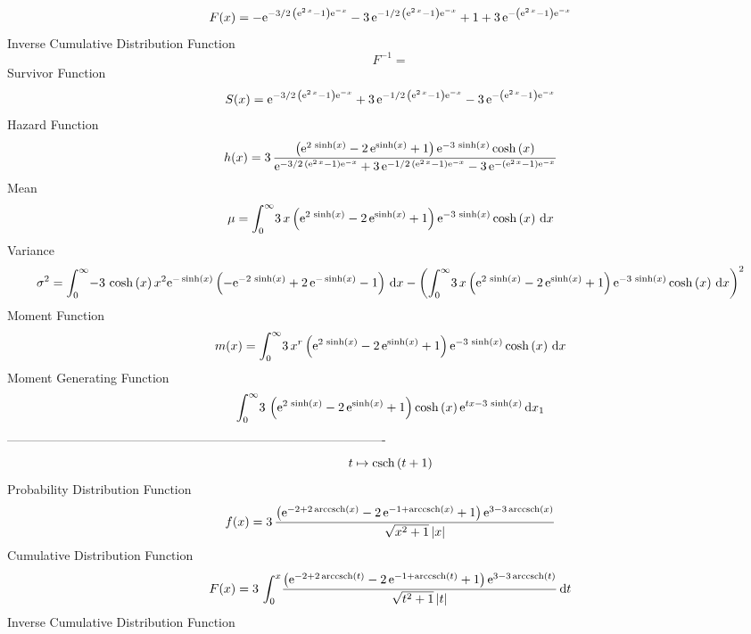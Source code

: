 \documentclass[12pt]{article}
\begin{document}
 $$F(x)=-{{\rm e}^{-3/2\, \left( {{\rm e}^{2\,x}}-1 \right) {{\rm e}^{-x}}}}-3
\,{{\rm e}^{-1/2\, \left( {{\rm e}^{2\,x}}-1 \right) {{\rm e}^{-x}}}}+
1+3\,{{\rm e}^{- \left( {{\rm e}^{2\,x}}-1 \right) {{\rm e}^{-x}}}}
$$ Inverse Cumulative Distribution Function 
  $$F^{-1} =  
$$Survivor Function 
 $$ S(x)={{\rm e}^{-3/2\, \left( {{\rm e}^{2\,x}}-1 \right) {{\rm e}^{-x}}}}+3
\,{{\rm e}^{-1/2\, \left( {{\rm e}^{2\,x}}-1 \right) {{\rm e}^{-x}}}}-
3\,{{\rm e}^{- \left( {{\rm e}^{2\,x}}-1 \right) {{\rm e}^{-x}}}}
$$ Hazard Function 
 $$ h(x)=3\,{\frac { \left( {{\rm e}^{2\,\sinh \left( x \right) }}-2\,{{\rm e}^
{\sinh \left( x \right) }}+1 \right) {{\rm e}^{-3\,\sinh \left( x
 \right) }}\cosh \left( x \right) }{{{\rm e}^{-3/2\, \left( {{\rm e}^{
2\,x}}-1 \right) {{\rm e}^{-x}}}}+3\,{{\rm e}^{-1/2\, \left( {{\rm e}^
{2\,x}}-1 \right) {{\rm e}^{-x}}}}-3\,{{\rm e}^{- \left( {{\rm e}^{2\,
x}}-1 \right) {{\rm e}^{-x}}}}}}
$$Mean 
 $$ \mu=\int_{0}^{\infty }\!3\,x \left( {{\rm e}^{2\,\sinh \left( x \right) }}
-2\,{{\rm e}^{\sinh \left( x \right) }}+1 \right) {{\rm e}^{-3\,\sinh
 \left( x \right) }}\cosh \left( x \right) \,{\rm d}x
$$ Variance 
 $$ \sigma^2 = \int_{0}^{\infty }\!-3\,\cosh \left( x \right) {x}^{2}{{\rm e}^{-\sinh
 \left( x \right) }} \left( -{{\rm e}^{-2\,\sinh \left( x \right) }}+2
\,{{\rm e}^{-\sinh \left( x \right) }}-1 \right) \,{\rm d}x- \left( 
\int_{0}^{\infty }\!3\,x \left( {{\rm e}^{2\,\sinh \left( x \right) }}
-2\,{{\rm e}^{\sinh \left( x \right) }}+1 \right) {{\rm e}^{-3\,\sinh
 \left( x \right) }}\cosh \left( x \right) \,{\rm d}x \right) ^{2}
$$Moment Function 
 $$ m(x) = \int_{0}^{\infty }\!3\,{x}^{r} \left( {{\rm e}^{2\,\sinh \left( x
 \right) }}-2\,{{\rm e}^{\sinh \left( x \right) }}+1 \right) {{\rm e}^
{-3\,\sinh \left( x \right) }}\cosh \left( x \right) \,{\rm d}x
$$ Moment Generating Function 
 $$\int_{0}^{\infty }\!3\, \left( {{\rm e}^{2\,\sinh \left( x \right) }}-
2\,{{\rm e}^{\sinh \left( x \right) }}+1 \right) \cosh \left( x
 \right) {{\rm e}^{tx-3\,\sinh \left( x \right) }}\,{\rm d}x_{{1}}
$$-------------------------------------------------------------------------------------------  \\$$t\mapsto {\rm csch} \left(t+1\right)
$$Probability Distribution Function 
$$  f(x)=3\,{\frac { \left( {{\rm e}^{-2+2\,{\rm arccsch} \left(x\right)}}-2\,{
{\rm e}^{-1+{\rm arccsch} \left(x\right)}}+1 \right) {{\rm e}^{3-3\,
{\rm arccsch} \left(x\right)}}}{\sqrt {{x}^{2}+1} \left| x \right| }}
$$Cumulative Distribution Function  
 $$F(x)=3\,\int_{0}^{x}\!{\frac { \left( {{\rm e}^{-2+2\,{\rm arccsch} \left(t
\right)}}-2\,{{\rm e}^{-1+{\rm arccsch} \left(t\right)}}+1 \right) {
{\rm e}^{3-3\,{\rm arccsch} \left(t\right)}}}{\sqrt {{t}^{2}+1}
 \left| t \right| }}\,{\rm d}t
$$ Inverse Cumulative Distribution Function 
\end{document}
